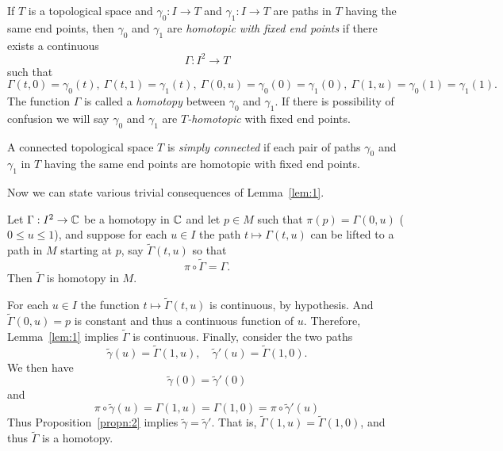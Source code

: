 \documentclass[a4paper,11pt]{article}
\newcounter{topic}
\begin{document}
\begin{defn}
  \label{def:6}
  If $T$ is a topological space and $\gamma_0 : I \to T$ and $\gamma_1
  : I \to T$ are paths in $T$ having the same end points, then
  $\gamma_0$ and $\gamma_1$ are \emph{homotopic with fixed end points}
  if there exists a continuous
  $$
  \Gamma : I^2 \to T
  $$
  such that
  $$
  \Gamma(t,0) = \gamma_0(t),\ 
  \Gamma(t,1) = \gamma_1(t),\ 
  \Gamma(0,u) = \gamma_0(0) = \gamma_1(0),\ 
  \Gamma(1,u) = \gamma_0(1) = \gamma_1(1).
  $$
  The function $\Gamma$ is called a \emph{homotopy} between $\gamma_0$
  and $\gamma_1$.  If there is possibility of confusion we will say
  $\gamma_0$ and $\gamma_1$ are \emph{$T$-homotopic} with fixed end
  points.
\end{defn}

\begin{defn}
  \label{def:7}
  A connected topological space $T$ is \emph{simply connected} if each
  pair of paths $\gamma_0$ and $\gamma_1$ in $T$ having the same end
  points are homotopic with fixed end points.
\end{defn}

Now we can state various trivial consequences of Lemma~\ref{lem:1}.

\begin{thm}[Covering Homotopy Theorem]
  Let $\Gamma : I^2 \to {\mathbb C}$ be a homotopy in ${\mathbb C}$ and let $p \in
  M$ such that $\pi(p) = \Gamma(0,u)$ ($0 \le u \le 1$), and suppose
  for each $u \in I$ the path $t \mapsto \Gamma(t,u)$ can be lifted to
  a path in $M$ starting at $p$, say $\widetilde{\Gamma}(t,u)$ so that
  $$
  \pi \circ \widetilde{\Gamma} = \Gamma.
  $$
  Then $\widetilde{\Gamma}$ is homotopy in $M$.
\end{thm}
\begin{myproof}
  For each $u \in I$ the function $t \mapsto \widetilde{\Gamma}(t,u)$
  is continuous, by hypothesis.  And $\widetilde{\Gamma}(0,u) = p$ is
  constant and thus a continuous function of $u$.  Therefore,
  Lemma~\ref{lem:1} implies $\widetilde{\Gamma}$ is continuous.
  Finally, consider the two paths
  $$
  \widetilde{\gamma}(u) = \widetilde{\Gamma}(1,u),\quad
  \widetilde{\gamma}'(u) = \widetilde{\Gamma}(1,0).
  $$
  We then have
  $$
  \widetilde{\gamma}(0) = \widetilde{\gamma}'(0)
  $$
  and
  $$
  \pi \circ \widetilde{\gamma}(u) 
  = \Gamma(1,u)
  = \Gamma(1,0)
  = \pi \circ \widetilde{\gamma}'(u)
  $$
  Thus Proposition~\ref{propn:2} implies $\widetilde{\gamma} =
  \widetilde{\gamma}'$.  That is, $\widetilde{\Gamma}(1,u) =
  \widetilde{\Gamma}(1,0)$, and thus $\widetilde{\Gamma}$ is a
  homotopy.
\end{myproof}
\end{document}
